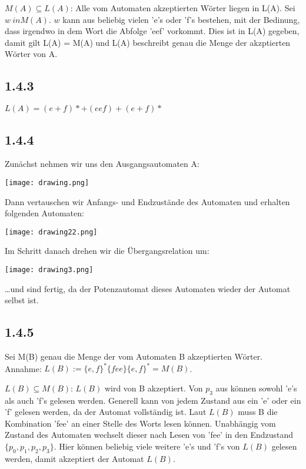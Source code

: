 \documentclass{article}
\begin{document}
$M(A) \subseteq L(A)$: Alle vom Automaten akzeptierten Wörter liegen in L(A).
Sei $w \ in M(A)$. $w$ kann aus beliebig vielen 'e's oder 'f's bestehen, mit der
Bedinung, dass irgendwo in dem Wort die Abfolge 'eef' vorkommt. Dies ist in L(A)
gegeben, damit gilt L(A) = M(A) und L(A) beschreibt genau die Menge der
akzptierten Wörter von A. 

\subsection*{1.4.3}
$L(A) = (e + f)* + (eef) + (e + f)*$

\subsection*{1.4.4}
Zunächst nehmen wir uns den Ausgangsautomaten A: \\
\begin{center}
\texttt{[image: drawing.png]}
\end{center}

Dann vertauschen wir Anfangs- und Endzustände des Automaten und erhalten
folgenden Automaten: \\
\begin{center}
\texttt{[image: drawing22.png]}
\end{center}

Im Schritt danach drehen wir die Übergangsrelation um:\\
\begin{center}
\texttt{[image: drawing3.png]}
\end{center}
\dots und sind fertig, da der Potenzautomat dieses Automaten wieder der Automat
selbst ist.


\subsection*{1.4.5}
Sei M(B) genau die Menge der vom Automaten B akzeptierten Wörter. Annahme: $L(B)
:= \{e,f\}^*\{fee\}\{e,f\}^* = M(B)$.

$L(B) \subseteq M(B)$: $L(B)$ wird von B akzeptiert. Von $p_3$ aus können sowohl
'e's als auch 'f's gelesen werden.  Generell kann von jedem Zustand aus ein 'e'
oder ein 'f' gelesen werden, da der Automat vollständig ist.  Laut $L(B)$ muss B
die Kombination 'fee' an einer Stelle des Worts lesen können. Unabhängig vom
Zustand des Automaten wechselt dieser nach Lesen von 'fee' in den Endzustand
$\{p_0, p_1, p_2, p_3\}$. Hier können beliebig viele weitere 'e's und 'f's von
$L(B)$ gelesen werden, damit akzeptiert der Automat $L(B)$.
 
\end{document}
